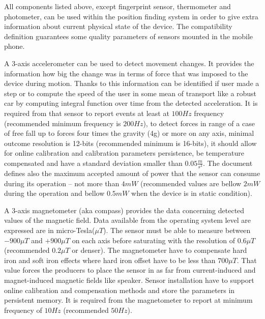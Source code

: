 \documentclass[../main.tex]{subfiles}
\begin{document}
All components listed above, except fingerprint sensor, thermometer and photometer, can be used within the position finding system in order to give extra information about current physical state of the device. The compatibility definition guarantees some quality parameters of sensors mounted in the mobile phone.

A 3-axis accelerometer can be used to detect movement changes. It provides the information how big the change was in terms of force that was imposed to the device during motion. Thanks to this information can be identified if user made a step or to compute the speed of the user in some mean of transport like a robust car by computing integral function over time from the detected acceleration. It is required from that sensor to report events at least at $100 Hz$ frequency (recommended minimum frequency is $200 Hz$), to detect forces in range of a case of free fall up to forces four times the gravity (4g) or more on any axis, minimal outcome resolution is 12-bits (recommended minimum is 16-bits), it should allow for online calibration and calibration parameters persistence, be temperature compensated and have a standard deviation smaller than $ 0.05 \frac{m}{s^2} $. The document defines also the maximum accepted amount of power that the sensor can consume during its operation -- not more than $4 mW$ (recommended values are bellow $2 mW$ during the operation and bellow $0.5 mW$ when the device is in static condition).

A 3-axis magnetometer (aka compass) provides the data concerning detected values of the magnetic field. Data available from the operating system level are expressed are in micro-Tesla($\mu T$). The sensor must be able to measure between $-900 \mu T$ and $+900 \mu T$ on each axis before saturating with the resolution of $0.6 \mu T$ (recommended $0.2 \mu T$ or denser). The magnetometer have to compensate hard iron and soft iron effects where hard iron offset have to be less than $700 \mu T$. That value forces the producers to place the sensor in as far from current-induced and magnet-induced magnetic fields like speaker. Sensor installation have to support online calibration and compensation methods and store the parameters in persistent memory. It is required from the magnetometer to report at minimum frequency of $10 Hz$ (recommended $50 Hz$).
\end{document}
